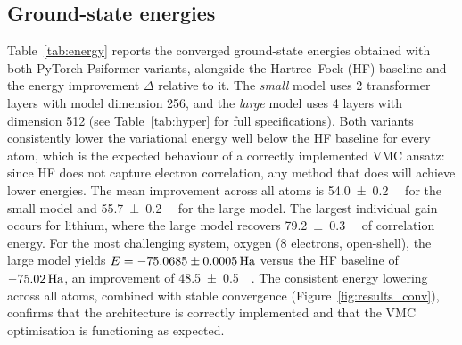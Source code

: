 \subsection{Ground-state energies}

Table~\ref{tab:energy} reports the converged ground-state energies obtained with both PyTorch Psiformer variants, alongside the Hartree--Fock (HF) baseline and the energy improvement $\Delta$ relative to it. The \emph{small} model uses 2 transformer layers with model dimension 256, and the \emph{large} model uses 4 layers with dimension 512 (see Table~\ref{tab:hyper} for full specifications). Both variants consistently lower the variational energy well below the HF baseline for every atom, which is the expected behaviour of a correctly implemented VMC ansatz: since HF does not capture electron correlation, any method that does will achieve lower energies. The mean improvement across all atoms is \SI{54.0 \pm 0.2}{\milli\ha} for the small model and \SI{55.7 \pm 0.2}{\milli\ha} for the large model. The largest individual gain occurs for lithium, where the large model recovers \SI{79.2 \pm 0.3}{\milli\ha} of correlation energy. For the most challenging system, oxygen (8 electrons, open-shell), the large model yields $E = -75.0685\pm0.0005\,\mathrm{Ha}$ versus the HF baseline of $-75.02\,\mathrm{Ha}$, an improvement of \SI{48.5 \pm 0.5}{\milli\ha}. The consistent energy lowering across all atoms, combined with stable convergence (Figure~\ref{fig:results_conv}), confirms that the architecture is correctly implemented and that the VMC optimisation is functioning as expected.

